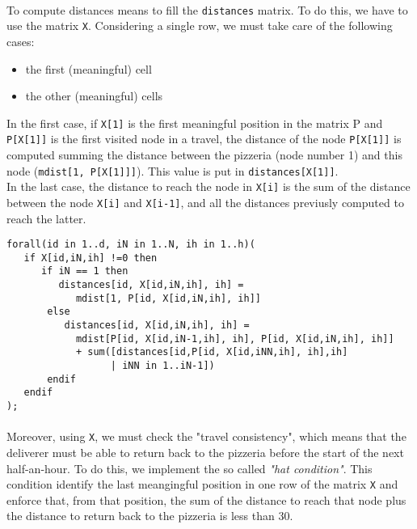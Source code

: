 \documentclass[10pt]{article}
\begin{document}
	\paragraph*{}
	To compute distances means to fill the \texttt{distances} matrix.
    To do this, we have to use the matrix \texttt{X}. 
	Considering a single row, we must take care of the following cases:
	\begin{itemize}
		\item the first (meaningful) cell
		\item the other (meaningful) cells
	\end{itemize}
	
	In the first case, if \texttt{X[1]} is the first meaningful position in the 
	matrix P and \texttt{P[X[1]]} is the first visited node in a travel,
	the distance of the node \texttt{P[X[1]]} is computed summing the 
	distance between the pizzeria (node number 1) and this node (\texttt{mdist[1, P[X[1]]]}).
	This value is put in \texttt{distances[X[1]]}.\\
	
	In the last case, the distance to reach the node in \texttt{X[i]} is 
	the sum of the distance between the node \texttt{X[i]} and \texttt{X[i-1]}, and all 
	the distances previusly computed to reach the latter. 
	\begin{verbatim}
forall(id in 1..d, iN in 1..N, ih in 1..h)(
   if X[id,iN,ih] !=0 then
      if iN == 1 then
         distances[id, X[id,iN,ih], ih] = 
            mdist[1, P[id, X[id,iN,ih], ih]] 
       else
          distances[id, X[id,iN,ih], ih] = 
            mdist[P[id, X[id,iN-1,ih], ih], P[id, X[id,iN,ih], ih]] 
         	+ sum([distances[id,P[id, X[id,iNN,ih], ih],ih]
                  | iNN in 1..iN-1])
       endif
   endif
);
	\end{verbatim}

	\paragraph*{}
	Moreover, using \texttt{X}, we must check the "travel consistency", which 
	means that the deliverer must be able to return back to the pizzeria before the 
	start of the next half-an-hour. 
	To do this, we implement the so called \textit{"hat condition"}. This condition 
	identify the last meangingful position in one row of the matrix \texttt{X}
	and enforce that, from that position, the sum of the distance to reach
	that node plus the distance to return back to the pizzeria is less than 30.
\end{document}
